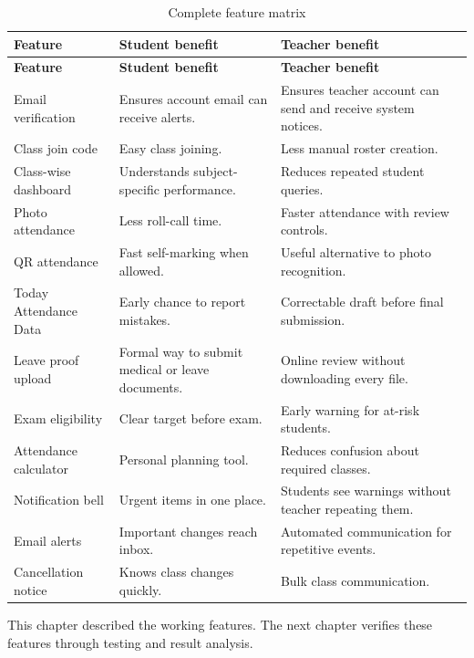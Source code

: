 \begin{longtable}{p{3.5cm} p{4.8cm} p{5.1cm}}
\caption{Complete feature matrix}
\label{tab:complete-feature-matrix}\\
\toprule
\textbf{Feature} & \textbf{Student benefit} & \textbf{Teacher benefit}\\
\midrule
\endfirsthead
\toprule
\textbf{Feature} & \textbf{Student benefit} & \textbf{Teacher benefit}\\
\midrule
\endhead
Email verification & Ensures account email can receive alerts. & Ensures teacher account can send and receive system notices.\\
Class join code & Easy class joining. & Less manual roster creation.\\
Class-wise dashboard & Understands subject-specific performance. & Reduces repeated student queries.\\
Photo attendance & Less roll-call time. & Faster attendance with review controls.\\
QR attendance & Fast self-marking when allowed. & Useful alternative to photo recognition.\\
Today Attendance Data & Early chance to report mistakes. & Correctable draft before final submission.\\
Leave proof upload & Formal way to submit medical or leave documents. & Online review without downloading every file.\\
Exam eligibility & Clear target before exam. & Early warning for at-risk students.\\
Attendance calculator & Personal planning tool. & Reduces confusion about required classes.\\
Notification bell & Urgent items in one place. & Students see warnings without teacher repeating them.\\
Email alerts & Important changes reach inbox. & Automated communication for repetitive events.\\
Cancellation notice & Knows class changes quickly. & Bulk class communication.\\
\bottomrule
\end{longtable}

This chapter described the working features. The next chapter verifies these features through testing and result analysis.
